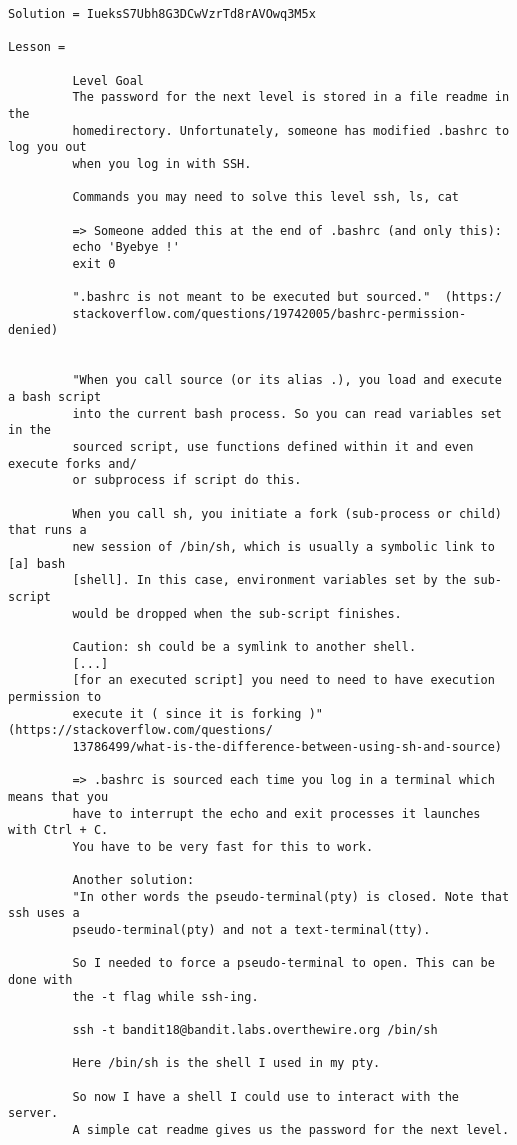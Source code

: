\documentclass[a4paper]{report}
\begin{document}
\begin{verbatim} 
Solution = IueksS7Ubh8G3DCwVzrTd8rAVOwq3M5x

Lesson =

		 Level Goal
		 The password for the next level is stored in a file readme in the
		 homedirectory. Unfortunately, someone has modified .bashrc to log you out
		 when you log in with SSH.
		 
		 Commands you may need to solve this level ssh, ls, cat
		 
		 => Someone added this at the end of .bashrc (and only this):
		 echo 'Byebye !'
		 exit 0
		 
		 ".bashrc is not meant to be executed but sourced."  (https:/
		 stackoverflow.com/questions/19742005/bashrc-permission-denied)


		 "When you call source (or its alias .), you load and execute a bash script
		 into the current bash process. So you can read variables set in the 
		 sourced script, use functions defined within it and even execute forks and/
		 or subprocess if script do this.

		 When you call sh, you initiate a fork (sub-process or child) that runs a 
		 new session of /bin/sh, which is usually a symbolic link to [a] bash 
		 [shell]. In this case, environment variables set by the sub-script 
		 would be dropped when the sub-script finishes.
		 
		 Caution: sh could be a symlink to another shell.
		 [...]
		 [for an executed script] you need to need to have execution permission to 
		 execute it ( since it is forking )" (https://stackoverflow.com/questions/
		 13786499/what-is-the-difference-between-using-sh-and-source)

		 => .bashrc is sourced each time you log in a terminal which means that you 
		 have to interrupt the echo and exit processes it launches with Ctrl + C. 
		 You have to be very fast for this to work.
		 
		 Another solution:
		 "In other words the pseudo-terminal(pty) is closed. Note that ssh uses a 
		 pseudo-terminal(pty) and not a text-terminal(tty).
		 
		 So I needed to force a pseudo-terminal to open. This can be done with 
		 the -t flag while ssh-ing.
		 
		 ssh -t bandit18@bandit.labs.overthewire.org /bin/sh
		 
		 Here /bin/sh is the shell I used in my pty.
		 
		 So now I have a shell I could use to interact with the server. 
		 A simple cat readme gives us the password for the next level.
		 

\end{verbatim}
\end{document}

